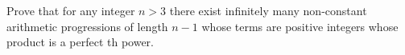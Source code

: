 Prove that for any integer $n>3$ there exist infinitely many non-constant arithmetic progressions of length $n-1$ whose terms are positive integers whose product is a perfect th power.